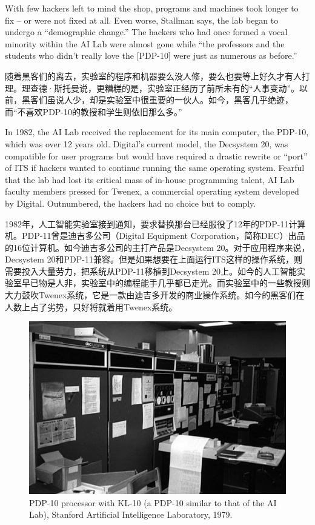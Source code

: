\ifdefined\eng
With few hackers left to mind the shop, programs and machines took longer to fix -- or were not fixed at all.  Even worse, Stallman says, the lab began to undergo a ``demographic change.'' The hackers who had once formed a vocal minority within the AI Lab were almost gone while ``the professors and the students who didn't really love the [PDP-10] were just as numerous as before.''
\fi

\ifdefined\chs
随着黑客们的离去，实验室的程序和机器要么没人修，要么也要等上好久才有人打理。理查德·斯托曼说，更糟糕的是，实验室正经历了前所未有的“人事变动”。以前，黑客们虽说人少，却是实验室中很重要的一伙人。如今，黑客几乎绝迹，而“不喜欢PDP-10的教授和学生则依旧那么多。”
\fi

\ifdefined\eng
In 1982, the AI Lab received the replacement for its main computer, the PDP-10, which was over 12 years old. Digital's current model, the Decsystem 20, was compatible for user programs but would have required a drastic rewrite or ``port'' of ITS if hackers wanted to continue running the same operating system. Fearful that the lab had lost its critical mass of in-house programming talent, AI Lab faculty members pressed for Twenex, a commercial operating system developed by Digital. Outnumbered, the hackers had no choice but to comply.
\fi

\ifdefined\chs
1982年，人工智能实验室接到通知，要求替换那台已经服役了12年的PDP-11计算机。PDP-11曾是迪吉多公司（Digital Equipment Corporation，简称DEC）出品的16位计算机。如今迪吉多公司的主打产品是Decsystem 20。对于应用程序来说，Decsystem 20和PDP-11兼容。但是如果想要在上面运行ITS这样的操作系统，则需要投入大量劳力，把系统从PDP-11移植到Decsystem 20上。如今的人工智能实验室早已物是人非，实验室中的编程能手几乎都已走光。而实验室中的一些教授则大力鼓吹Twenex系统，它是一款由迪吉多开发的商业操作系统。如今的黑客们在人数上占了劣势，只好将就着用Twenex系统。
\fi

\ifdefined\eng
\begin{figure}[ht] \centering
  \includegraphics{KL10_1979}
  \caption{PDP-10 processor with KL-10 (a PDP-10 similar to that of the AI Lab), Stanford Artificial Intelligence Laboratory, 1979.}
\end{figure}
\fi

